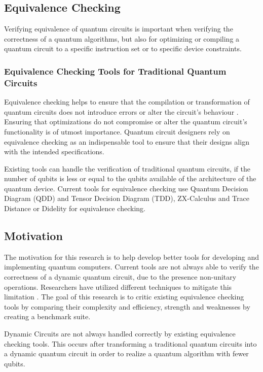 \documentclass[11pt]{article}
\theoremstyle{definition}
\theoremstyle{definition}
\begin{document}
\subsection{Equivalence Checking}
\label{sec:org1771e18}
Verifying equivalence of quantum circuits is important when
verifying the correctness of a quantum algorithms, but also for
optimizing or compiling a quantum circuit to a specific
instruction set or to specific device constraints.

\subsubsection{Equivalence Checking Tools for Traditional Quantum Circuits}
\label{sec:org82b679b}

Equivalence checking helps to ensure that the compilation
or transformation of quantum circuits does not introduce errors or alter the
circuit's behaviour \cite{burgholzer_advanced_2020}.
Ensuring that optimizations do not compromise or alter the
quantum circuit's functionality is of utmost importance.
Quantum circuit designers rely on equivalence checking as an indispensable tool to ensure that their designs align with the intended specifications.

Existing tools can handle the verification of traditional quantum circuits,
if the number of qubits is less or equal to the qubits available
of the architecture of the quantum device.
Current tools for equivalence checking use Quantum Decision Diagram (QDD)
and Tensor Decision Diagram (TDD), ZX-Calculus and Trace Distance or
Didelity for equivalence checking.


\subsection{Motivation}
\label{sec:org19ae0a0}
The motivation for this research is to help develop better tools for
developing and implementing quantum computers.
Current tools are not always able to verify the correctness of a dynamic quantum
circuit, due to the presence non-unitary operations.
Researchers have utilized different techniques to mitigate this limitation
\cite{burgholzerHandlingNonunitariesQuantum2022}\cite{hongEquivalenceCheckingDynamic2021}.
The goal of this research is to critic existing equivalence checking tools
by comparing their complexity and efficiency, strength and weaknesses by
creating a benchmark suite.

Dynamic Circuits are not always handled correctly by existing equivalence
checking tools. This occurs after transforming a traditional quantum
circuits into a dynamic quantum circuit in order to realize a quantum
algorithm with fewer qubits.
\end{document}
